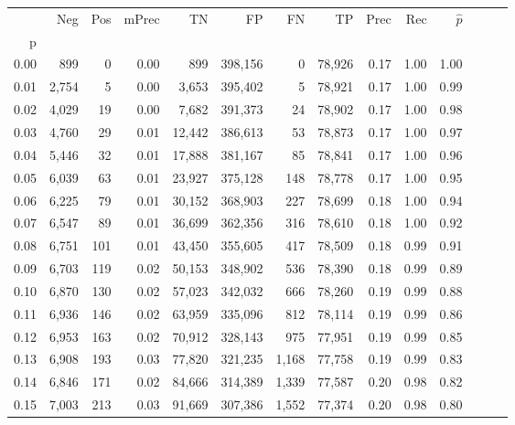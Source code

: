 \begin{tabular}{rrrrrrrrrrrrrr}
\toprule
{} &    Neg &    Pos & mPrec &       TN &       FP &      FN &      TP &  Prec &   Rec & $\hat{p}$ \\
p    &        &        &       &          &          &         &         &       &       &           \\
\midrule
0.00 &    899 &      0 &  0.00 &      899 &  398,156 &       0 &  78,926 &  0.17 &  1.00 &      1.00 \\
0.01 &  2,754 &      5 &  0.00 &    3,653 &  395,402 &       5 &  78,921 &  0.17 &  1.00 &      0.99 \\
0.02 &  4,029 &     19 &  0.00 &    7,682 &  391,373 &      24 &  78,902 &  0.17 &  1.00 &      0.98 \\
0.03 &  4,760 &     29 &  0.01 &   12,442 &  386,613 &      53 &  78,873 &  0.17 &  1.00 &      0.97 \\
0.04 &  5,446 &     32 &  0.01 &   17,888 &  381,167 &      85 &  78,841 &  0.17 &  1.00 &      0.96 \\
0.05 &  6,039 &     63 &  0.01 &   23,927 &  375,128 &     148 &  78,778 &  0.17 &  1.00 &      0.95 \\
0.06 &  6,225 &     79 &  0.01 &   30,152 &  368,903 &     227 &  78,699 &  0.18 &  1.00 &      0.94 \\
0.07 &  6,547 &     89 &  0.01 &   36,699 &  362,356 &     316 &  78,610 &  0.18 &  1.00 &      0.92 \\
0.08 &  6,751 &    101 &  0.01 &   43,450 &  355,605 &     417 &  78,509 &  0.18 &  0.99 &      0.91 \\
0.09 &  6,703 &    119 &  0.02 &   50,153 &  348,902 &     536 &  78,390 &  0.18 &  0.99 &      0.89 \\
0.10 &  6,870 &    130 &  0.02 &   57,023 &  342,032 &     666 &  78,260 &  0.19 &  0.99 &      0.88 \\
0.11 &  6,936 &    146 &  0.02 &   63,959 &  335,096 &     812 &  78,114 &  0.19 &  0.99 &      0.86 \\
0.12 &  6,953 &    163 &  0.02 &   70,912 &  328,143 &     975 &  77,951 &  0.19 &  0.99 &      0.85 \\
0.13 &  6,908 &    193 &  0.03 &   77,820 &  321,235 &   1,168 &  77,758 &  0.19 &  0.99 &      0.83 \\
0.14 &  6,846 &    171 &  0.02 &   84,666 &  314,389 &   1,339 &  77,587 &  0.20 &  0.98 &      0.82 \\
0.15 &  7,003 &    213 &  0.03 &   91,669 &  307,386 &   1,552 &  77,374 &  0.20 &  0.98 &      0.80 \\

\end{tabular}
